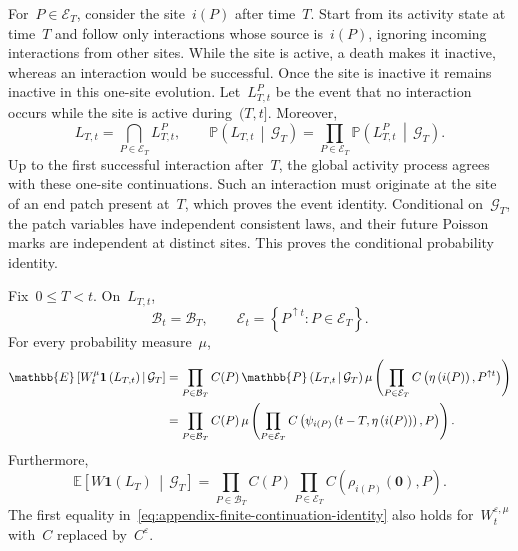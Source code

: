 \documentclass[EJP,preprint,NODS,nobera]{ejpecp}
\newcommand{\pP}{\mathbb{P}}
\newcommand{\E}{\mathbb{E}}
\newcommand{\CE}[2]{\E\Cb{#1\,\middle|\,#2}}
\newcommand{\CP}[2]{\pP\bb{#1\,\middle|\,#2}}
\newcommand{\bb}[1]{\left(#1\right)}
\newcommand{\Cb}[1]{\left[#1\right]}
\newcommand{\cb}[1]{\left\{#1\right\}}
\newcommand{\ind}{\mathbf{1}}
\newcommand{\mb}[1]{\mathbf{#1}}
\newcommand{\rev}[1]{{\color{red}#1}}
\begin{document}
For~$P\in\mathcal E_T$, consider the site~$i(P)$ after time~$T$.
Start from its activity state at time~$T$ and follow only interactions whose
source is~$i(P)$, ignoring incoming interactions from other sites. While the
site is active, a death makes it inactive, whereas an
\rev{interaction would be successful}. Once the site is inactive it
remains inactive in this one-site evolution. Let~$L_{T,t}^P$ be the event that
no interaction occurs while the site is active during~$(T,t]$. 
Moreover,
\begin{equation}
\label{eq:local-no-late-factorization}
L_{T,t}
=
\bigcap_{P\in\mathcal E_T}L_{T,t}^P,
\qquad
\CP{L_{T,t}}{\mathcal G_T}
=
\prod_{P\in\mathcal E_T}
\CP{L_{T,t}^P}{\mathcal G_T}.
\end{equation}
{\color{red}
Up to the first successful interaction after~$T$, the global activity process
agrees with these one-site continuations. Such an interaction must originate
at the site of an end patch present at~$T$, which proves the event identity.
Conditional on~$\mathcal G_T$, the patch variables have independent consistent
laws, and their future Poisson marks are independent at distinct sites.
This proves the conditional probability identity.
}

\begin{lemma}
\label{prop:no-late-continuation-identity}
Fix~$0\leq T<t$. On~$L_{T,t}$,
\begin{equation*}
\mathcal B_t=\mathcal B_T,
\qquad
\mathcal E_t
=
\cb{P^{\uparrow t}:P\in\mathcal E_T}.
\end{equation*}
For every probability measure~$\mu$,
\begin{align}
\CE{W_t^\mu\ind\bb{L_{T,t}}}{\mathcal G_T}
&=
\prod_{P\in\mathcal B_T}C(P)\,
\CP{L_{T,t}}{\mathcal G_T}
\mu\bb{
 \prod_{P\in\mathcal E_T}
 C\bb{\eta\bb{i(P)},P^{\uparrow t}}
}
\notag
\\
&=
\prod_{P\in\mathcal B_T}C(P)\,
\mu\bb{
 \prod_{P\in\mathcal E_T}
 C\bb{\psi_{i(P)}\bb{t-T,\eta\bb{i(P)}},P}
}.
\label{eq:appendix-finite-continuation-identity}
\end{align}
Furthermore,
\begin{equation}
\label{eq:appendix-infinite-continuation-identity}
\CE{W\ind\bb{L_T}}{\mathcal G_T}
=
\prod_{P\in\mathcal B_T}C(P)
\prod_{P\in\mathcal E_T}
C\bb{\rho_{i(P)}(\mb 0),P}.
\end{equation}
The first equality in~\eqref{eq:appendix-finite-continuation-identity} also
holds for~$W_t^{\varepsilon,\mu}$ with~$C$ replaced by~$C^\varepsilon$.
\end{lemma}
\end{document}
